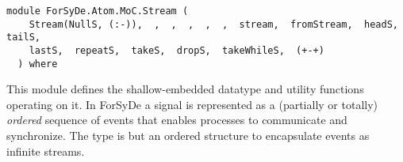\label{module:ForSyDe.Atom.MoC.Stream}
\haddockbeginheader
{\haddockverb\begin{verbatim}
module ForSyDe.Atom.MoC.Stream (
    Stream(NullS, (:-)),  ,  ,  ,  ,  ,  stream,  fromStream,  headS,  tailS, 
    lastS,  repeatS,  takeS,  dropS,  takeWhileS,  (+-+)
  ) where\end{verbatim}}
\haddockendheader

This module defines the shallow-embedded  datatype and
 utility functions operating on it. In ForSyDe a signal is
 represented as a (partially or totally) \emph{ordered} sequence of
 events that enables processes to communicate and synchronize.  The
  type is but an ordered structure to encapsulate events as
 infinite streams.\par

